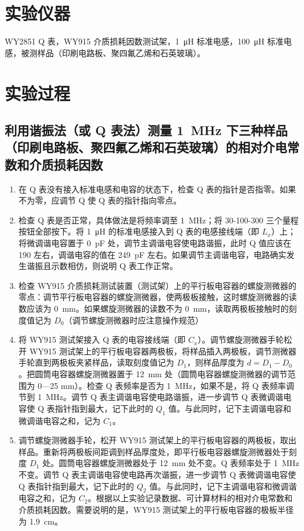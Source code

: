 \documentclass[a4paper,utf8]{article}
\begin{document}
\section{实验仪器}%
    WY2851 Q 表，WY915 介质损耗因数测试架，\SI{1}{\micro\henry} 标准电感，\SI{100}{\micro\henry} 标准电感，被测样品（印刷电路板、聚四氟乙烯和石英玻璃）。

\section{实验过程}%
    \subsection{利用谐振法（或 Q 表法）测量 \SI{1}{\mega\hertz} 下三种样品（印刷电路板、聚四氟乙烯和石英玻璃）的相对介电常数和介质损耗因数}
    \begin{enumerate}
        \item 在 Q 表没有接入标准电感和电容的状态下，检查 Q 表的指针是否指零。如果不为零，应调节 Q 使 Q 表的指针指向零点。
        \item 检查 Q 表是否正常，具体做法是将频率调至 \SI{1}{\mega\hertz}；将 30-100-300 三个量程按钮全部按下。将 \SI{1}{\micro\henry} 的标准电感接入到 Q 表的电感接线端（即 $L_x$）上；将微调谐电容置于 \SI{0}{\pico\farad} 处，调节主调谐电容使电路谐振，此时 Q 值应该在 190 左右，调谐电容的值在 \SI{249}{\pico\farad} 左右。如果调节主调谐电容，电路确实发生谐振且示数相仿，则说明 Q 表工作正常。
        \item 检查 WY915 介质损耗测试装置（测试架）上的平行板电容器的螺旋测微器的零点：调节平行板电容器的螺旋测微器，使两极板接触，这时螺旋测微器的读数应该为 \SI{0}{\milli\metre}。如果螺旋测微器的读数不为 \SI{0}{\milli\metre}，读取两极板接触时的刻度值记为 $D_0$（调节螺旋测微器时应注意操作规范）
        \item 将 WY915 测试架接入 Q 表的电容接线端（即 $C_x$）。调节螺旋测微器手轮松开 WY915 测试架上的平行板电容器两极板，将样品插入两极板，调节测微器手轮直到两极板夹紧样品，读取刻度值记为 $D_1$，则样品厚度为 $d = D_1 - D_0$。把圆筒电容器螺旋测微器置于 \SI{12}{\milli\metre} 处（圆筒电容器螺旋测微器的调节范围为 0—25 \unit{\milli\metre}）。检查 Q 表频率是否为 \SI{1}{\mega\hertz}，如果不是，将 Q 表频率调节到 \SI{1}{\mega\hertz}。调节 Q 表主调谐电容使电路谐振，进一步调节 Q 表微调谐电容使 Q 表指针指到最大，记下此时的 $Q_1$ 值。与此同时，记下主调谐电容和微调谐电容之和，记为 $C_1$。
        \item 调节螺旋测微器手轮，松开 WY915 测试架上的平行板电容器的两极板，取出样品。重新将两极板间距调到样品厚度处，即平行板电容器螺旋测微器处于刻度 $D_1$ 处。圆筒电容器螺旋测微器处于 \SI{12}{\milli\metre} 处不变。Q 表频率处于 \SI{1}{\mega\hertz} 不变。调节 Q 表主调谐电容使电路再次谐振，进一步调节 Q 表微调谐电容使 Q 表指针指到最大，记下此时的 $Q_2$ 值。与此同时，记下主调谐电容和微调谐电容之和，记为 $C_2$。根据以上实验记录数据、可计算材料的相对介电常数和介质损耗因数。需要说明的是，WY915 测试架上的平行板电容器的极板半径为 \SI{1.9}{\centi\metre}。
    \end{enumerate}
\end{document}
